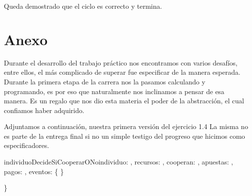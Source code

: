 \documentclass[10pt,a4paper]{article}
\begin{document}
\begin{proof*}
\begin{itemize}
\begin{itemize}
        \end{itemize}
    \end{itemize}

    Queda demostrado que el ciclo es correcto y termina.






\vspace{1cm}

\section{Anexo}

\begin{minipage}[t]{18cm}
    Durante el desarrollo del trabajo práctico nos encontramos con varios desafíos, entre ellos, el más complicado de superar fue especificar de la manera esperada. Durante la primera etapa de la carrera nos la pasamos calculando y programando, es por eso que naturalmente nos inclinamos a pensar de esa manera. Es un regalo que nos dio esta materia el poder de la abstracción, el cual confiamos haber adquirido.

    Adjuntamos a continuación, nuestra primera versión del ejercicio 1.4 La misma no es parte de la entrega final si no un simple testigo del progreso que hicimos como especificadores.
\end{minipage}
\vspace{1cm}
\begin{proc}{individuoDecideSiCooperarONo}{\In individuo: \nat, \In recursos: \TLista{\float}, \Inout cooperan: \TLista{\bool}, \In apuestas:
\TLista{\TLista{\float}}, \In pagos: \TLista{\TLista{\float}}, \In eventos: \TLista{\TLista{\nat}}}{\{}
	\} \\
\end{proc}
\}


\end{proof*}
\end{document}
